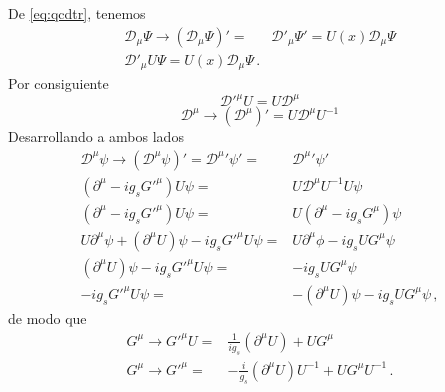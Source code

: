 De \eqref{eq:qcdtr}, tenemos
\begin{align}
   \mathcal{D}_\mu\Psi\to \left(\mathcal{D}_\mu\Psi\right)'=&\mathcal{D}'_\mu\Psi'
  =U(x)\mathcal{D}_\mu\Psi\nonumber\\
\mathcal{D}'_\mu U\Psi
  =U(x)\mathcal{D}_\mu\Psi\,.
\end{align}
Por consiguiente
\begin{equation}
  {\mathcal{D}'}^\mu U=U\mathcal{D}^\mu
\end{equation}
\begin{equation}
  \mathcal{D}^\mu\to\left(
    \mathcal{D}^\mu
  \right)'=U\mathcal{D}^\mu U^{-1}
\end{equation}
Desarrollando a ambos lados
\begin{align}
  \label{eq:251qft}
   {\mathcal{D}}^\mu\psi\to{\left({\mathcal{D}}^\mu\psi\right)}'=
  {\mathcal{D}^\mu}'\psi'=&{\mathcal{D}^\mu}'\psi'\nonumber\\
  (\partial^\mu-i g_s {G'}^\mu) U\psi=&U\mathcal{D}^\mu U^{-1}U\psi\nonumber\\
  (\partial^\mu-i g_s {G'}^\mu) U\psi=&U(\partial^\mu-i g_s {G}^\mu)\psi\nonumber\\
  U\partial^\mu\psi+(\partial^\mu U)\psi-i g_s {G'}^\mu U \psi=&U\partial^\mu\phi-i g_s U {G}^\mu \psi\nonumber\\
  (\partial^\mu U)\psi-i g_s {G'}^\mu U \psi=&-i g_s U {G}^\mu \psi\nonumber\\
  -i g_s {G'}^\mu U \psi=&-(\partial^\mu U)\psi-i g_s U {G}^\mu \psi\,,
\end{align}
de modo que
\begin{align}
 G^{\mu}\to     {G'}^\mu U =&\frac{1}{i g_s}(\partial^\mu U)+ U{G}^\mu \nonumber\\
 G^{\mu}\to  {G'}^\mu  =&-\frac{i}{g_s}(\partial^\mu U)U^{-1}+ U{G}^\mu U^{-1}\,.
\end{align}


